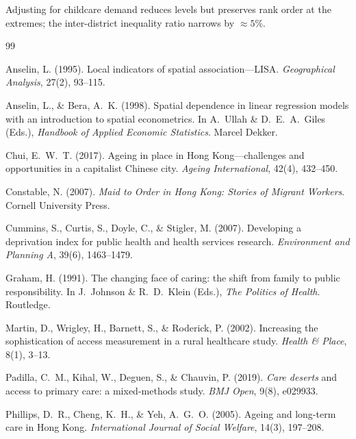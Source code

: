 \documentclass[11pt,a4paper]{article}
\begin{document}
Adjusting for childcare demand reduces levels but preserves rank order at the extremes; the inter-district inequality ratio narrows by ${\approx}5\%$.

\begin{thebibliography}{99}

Anselin, L. (1995).
\newblock Local indicators of spatial association---LISA.
\newblock \emph{Geographical Analysis}, 27(2), 93--115.

Anselin, L., \& Bera, A.~K. (1998).
\newblock Spatial dependence in linear regression models with an introduction to spatial econometrics.
\newblock In A.~Ullah \& D.~E.~A.~Giles (Eds.), \emph{Handbook of Applied Economic Statistics}. Marcel Dekker.

Chui, E.~W.~T. (2017).
\newblock Ageing in place in Hong Kong---challenges and opportunities in a capitalist Chinese city.
\newblock \emph{Ageing International}, 42(4), 432--450.

Constable, N. (2007).
\newblock \emph{Maid to Order in Hong Kong: Stories of Migrant Workers}.
\newblock Cornell University Press.

Cummins, S., Curtis, S., Doyle, C., \& Stigler, M. (2007).
\newblock Developing a deprivation index for public health and health services research.
\newblock \emph{Environment and Planning A}, 39(6), 1463--1479.

Graham, H. (1991).
\newblock The changing face of caring: the shift from family to public responsibility.
\newblock In J.~Johnson \& R.~D.~Klein (Eds.), \emph{The Politics of Health}. Routledge.

Martin, D., Wrigley, H., Barnett, S., \& Roderick, P. (2002).
\newblock Increasing the sophistication of access measurement in a rural healthcare study.
\newblock \emph{Health \& Place}, 8(1), 3--13.

Padilla, C.~M., Kihal, W., Deguen, S., \& Chauvin, P. (2019).
\newblock \emph{Care deserts} and access to primary care: a mixed-methods study.
\newblock \emph{BMJ Open}, 9(8), e029933.

Phillips, D.~R., Cheng, K.~H., \& Yeh, A.~G.~O. (2005).
\newblock Ageing and long-term care in Hong Kong.
\newblock \emph{International Journal of Social Welfare}, 14(3), 197--208.


\end{thebibliography}
\end{document}
